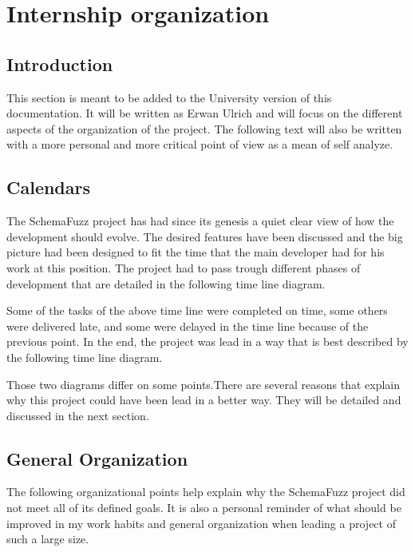 
\section{Internship organization} 
	\subsection{Introduction}

This section is meant to be added to the University version of this documentation. It will be written as Erwan Ulrich and will focus on the different aspects of the organization of the project. The following text will also be written with a more personal and more critical point of view as a mean of self analyze.

	\subsection{Calendars}
	
The	SchemaFuzz project has had since its genesis a quiet clear view of how the development should evolve. The desired features have been discussed and the big picture had been designed to fit the time that the main developer had for his work at this position.
The project had to pass trough different phases of development that are detailed in the following time line diagram. %

Some of the tasks of the above time line were completed on time, some others were delivered late, and some were delayed in the time line because of the previous point.
In the end, the project was lead in a way that is best described by the following time line diagram. %

Those two diagrams differ on some points.There are several reasons that explain why this project could have been lead in a better way. They will be detailed and discussed in the next section. 

	\subsection{General Organization}
The following organizational points help explain why the SchemaFuzz project did not meet all of its defined goals.
It is also a personal reminder of what should be improved in my work habits and general organization when leading a project of such a large size. 
	
